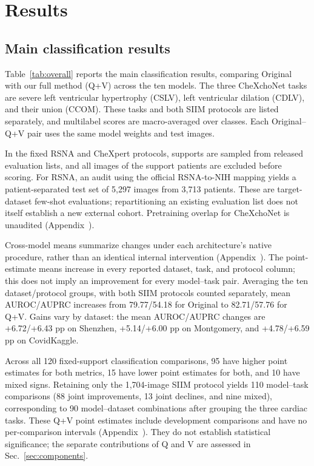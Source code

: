 \documentclass[10pt,twocolumn,letterpaper]{article}
\begin{document}
\section{Results}
\label{sec:results}
\subsection{Main classification results}
\label{sec:overall}

Table~\ref{tab:overall} reports the main classification results, comparing Original with our full method (Q+V) across the ten models. The three CheXchoNet tasks are severe left ventricular hypertrophy (CSLV), left ventricular dilation (CDLV), and their union (CCOM). These tasks and both SIIM protocols are listed separately, and multilabel scores are macro-averaged over classes. Each Original--Q+V pair uses the same model weights and test images.



In the fixed RSNA and CheXpert protocols, supports are sampled from released evaluation lists, and all images of the support patients are excluded before scoring. For RSNA, an audit using the official RSNA-to-NIH mapping yields a patient-separated test set of 5,297 images from 3,713 patients. These are target-dataset few-shot evaluations; repartitioning an existing evaluation list does not itself establish a new external cohort. Pretraining overlap for CheXchoNet is unaudited (Appendix~).

Cross-model means summarize changes under each architecture's native procedure, rather than an identical internal intervention (Appendix~). The point-estimate means increase in every reported dataset, task, and protocol column; this does not imply an improvement for every model--task pair. Averaging the ten dataset/protocol groups, with both SIIM protocols counted separately, mean AUROC/AUPRC increases from 79.77/54.18 for Original to 82.71/57.76 for Q+V. Gains vary by dataset: the mean AUROC/AUPRC changes are +6.72/+6.43 pp on Shenzhen, +5.14/+6.00 pp on Montgomery, and +4.78/+6.59 pp on CovidKaggle.

Across all 120 fixed-support classification comparisons, 95 have higher point estimates for both metrics, 15 have lower point estimates for both, and 10 have mixed signs. Retaining only the 1,704-image SIIM protocol yields 110 model--task comparisons (88 joint improvements, 13 joint declines, and nine mixed), corresponding to 90 model--dataset combinations after grouping the three cardiac tasks. These Q+V point estimates include development comparisons and have no per-comparison intervals (Appendix~). They do not establish statistical significance; the separate contributions of Q and V are assessed in Sec.~\ref{sec:components}.
\end{document}
